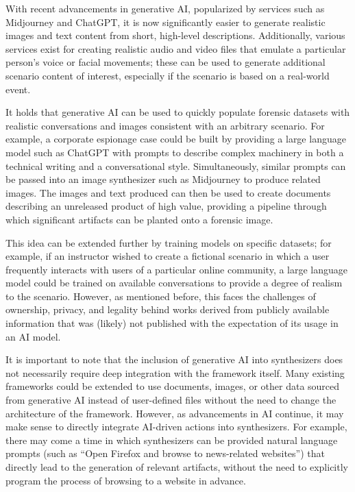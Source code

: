 With recent advancements in generative AI, popularized by services such
as Midjourney and ChatGPT, it is now significantly easier to generate
realistic images and text content from short, high-level descriptions.
Additionally, various services exist for creating realistic audio and
video files that emulate a particular person's voice or facial
movements; these can be used to generate additional scenario content of
interest, especially if the scenario is based on a real-world event.

It holds that generative AI can be used to quickly populate forensic
datasets with realistic conversations and images consistent with an
arbitrary scenario. For example, a corporate espionage case could be
built by providing a large language model such as ChatGPT with prompts
to describe complex machinery in both a technical writing and a
conversational style. Simultaneously, similar prompts can be passed into
an image synthesizer such as Midjourney to produce related images. The
images and text produced can then be used to create documents describing
an unreleased product of high value, providing a pipeline through which
significant artifacts can be planted onto a forensic image.

This idea can be extended further by training models on specific
datasets; for example, if an instructor wished to create a fictional
scenario in which a user frequently interacts with users of a particular
online community, a large language model could be trained on available
conversations to provide a degree of realism to the scenario. However,
as mentioned before, this faces the challenges of ownership, privacy,
and legality behind works derived from publicly available information
that was (likely) not published with the expectation of its usage in an
AI model.

It is important to note that the inclusion of generative AI into
synthesizers does not necessarily require deep integration with the
framework itself. Many existing frameworks could be extended to use
documents, images, or other data sourced from generative AI instead of
user-defined files without the need to change the architecture of the
framework. However, as advancements in AI continue, it may make sense to
directly integrate AI-driven actions into synthesizers. For example,
there may come a time in which synthesizers can be provided natural
language prompts (such as ``Open Firefox and browse to news-related
websites'') that directly lead to the generation of relevant artifacts,
without the need to explicitly program the process of browsing to a
website in advance.
